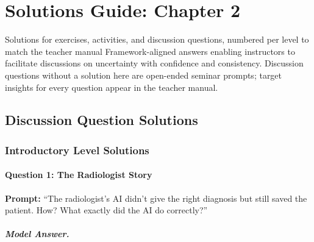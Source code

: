 
\chapter{Solutions Guide: Chapter 2}
\label{ch:solutions-ch02}

\begin{chapterquote}{Solutions for exercises, activities, and discussion questions, numbered per level to match the teacher manual}
Framework-aligned answers enabling instructors to facilitate discussions on uncertainty with confidence and consistency. Discussion questions without a solution here are open-ended seminar prompts; target insights for every question appear in the teacher manual.
\end{chapterquote}

\section{Discussion Question Solutions}

\subsection{Introductory Level Solutions}

\subsubsection{Question 1: The Radiologist Story}

\textbf{Prompt:} ``The radiologist's AI didn't give the right diagnosis but still saved the patient. How? What exactly did the AI do correctly?''

\paragraph{Model Answer.}

